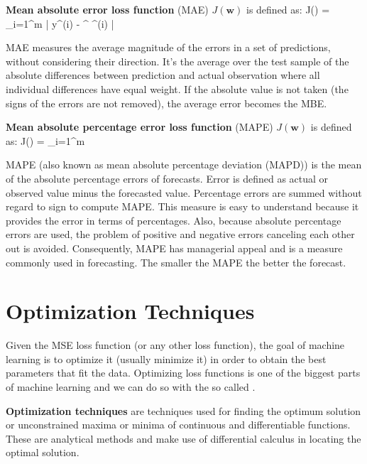 \textbf{Mean absolute error loss function} (MAE) $J(\boldsymbol{w})$ is defined as:
\bse
J() =  \sum_{i=1}^{m} | y^{(i)} - ^{\intercal} ^{(i)} |
\ese
\ed

MAE measures the average magnitude of the errors in a set of predictions, without considering their direction. It's
the average over the test sample of the absolute differences between prediction and actual observation where all
individual differences have equal weight. If the absolute value is not taken (the signs of the errors are not
removed), the average error becomes the MBE\@.

\textbf{Mean absolute percentage error loss function} (MAPE) $J(\boldsymbol{w})$ is defined as:
\bse
J() =  \sum_{i=1}^{m} \Big{|}  \Big{|}
\ese
\ed

MAPE (also known as mean absolute percentage deviation (MAPD)) is the mean of the absolute percentage errors of
forecasts. Error is defined as actual or observed value minus the forecasted value. Percentage errors are summed
without regard to sign to compute MAPE. This measure is easy to understand because it provides the error in terms of
percentages. Also, because absolute percentage errors are used, the problem of positive and negative errors canceling
each other out is avoided. Consequently, MAPE has managerial appeal and is a measure commonly used in forecasting.
The smaller the MAPE the better the forecast.

\section{Optimization Techniques}

Given the MSE loss function (or any other loss function), the goal of machine learning is to optimize it (usually
minimize it) in order to obtain the best parameters that fit the data. Optimizing loss functions is one of the
biggest parts of machine learning and we can do so with the so called .

\textbf{Optimization techniques} are techniques used for finding the optimum solution or unconstrained maxima or
minima of continuous and differentiable functions. These are analytical methods and make use of differential calculus
in locating the optimal solution.
\ed

